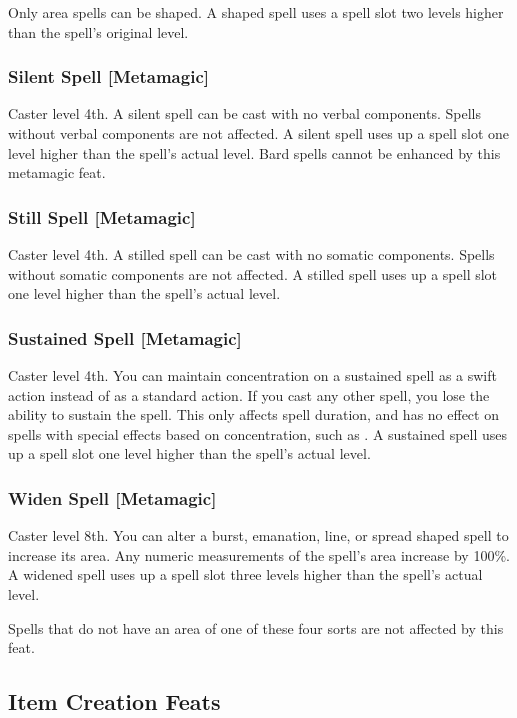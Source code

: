 Only area spells can be shaped. A shaped spell uses a spell slot two levels higher than the spell's original level.

\subsubsection{Silent Spell [Metamagic]}
 Caster level 4th.
 A silent spell can be cast with no verbal components. Spells without verbal components are not affected. A silent spell uses up a spell slot one level higher than the spell's actual level.
 Bard spells cannot be enhanced by this metamagic feat.

\subsubsection{Still Spell [Metamagic]}
 Caster level 4th.
 A stilled spell can be cast with no somatic components. Spells without somatic components are not affected. A stilled spell uses up a spell slot one level higher than the spell's actual level.

\subsubsection{Sustained Spell [Metamagic]}
\featpre Caster level 4th.
\featben You can maintain concentration on a sustained spell as a swift action instead of as a standard action. If you cast any other spell, you lose the ability to sustain the spell. This only affects spell duration, and has no effect on spells with special effects based on concentration, such as . A sustained spell uses up a spell slot one level higher than the spell's actual level.

\subsubsection{Widen Spell [Metamagic]}
 Caster level 8th.
 You can alter a burst, emanation, line, or spread shaped spell to increase its area. Any numeric measurements of the spell's area increase by 100\%. A widened spell uses up a spell slot three levels higher than the spell's actual level.
\par Spells that do not have an area of one of these four sorts are not affected by this feat.

\subsection{Item Creation Feats}

